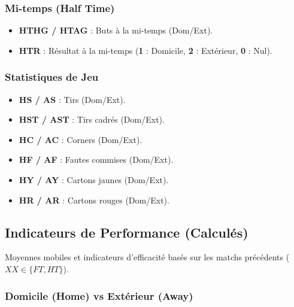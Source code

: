 \subsubsection{Mi-temps (Half Time)}
\begin{itemize}
    \item \textbf{HTHG / HTAG} : Buts à la mi-temps (Dom/Ext).
    \item \textbf{HTR} : Résultat à la mi-temps 
    (\textbf{1} : Domicile, \textbf{2} : Extérieur, \textbf{0} : Nul).
\end{itemize}

\subsubsection{Statistiques de Jeu}
\begin{itemize}
    \item \textbf{HS / AS} : Tirs (Dom/Ext).
    \item \textbf{HST / AST} : Tirs cadrés (Dom/Ext).
    \item \textbf{HC / AC} : Corners (Dom/Ext).
    \item \textbf{HF / AF} : Fautes commises (Dom/Ext).
    \item \textbf{HY / AY} : Cartons jaunes (Dom/Ext).
    \item \textbf{HR / AR} : Cartons rouges (Dom/Ext).
\end{itemize}

\subsection{Indicateurs de Performance (Calculés)}

Moyennes mobiles et indicateurs d'efficacité basés sur les matchs précédents 
($XX \in \{FT, HT\}$).

\subsubsection{Domicile (Home) vs Extérieur (Away)}


